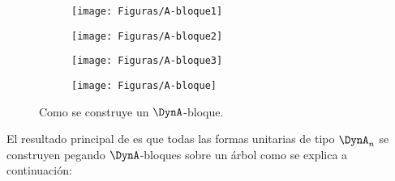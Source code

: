 \begin{figure}[H]
    \begin{subfigure}[b]{0.5\textwidth}
        \begin{minipage}{7cm}
        \centering%
         \texttt{[image: Figuras/A-bloque1]}
        \end{minipage}
    \end{subfigure}
    \begin{subfigure}[b]{0.5\textwidth}
        \begin{minipage}{7cm}
        \centering%
         \texttt{[image: Figuras/A-bloque2]}
        \end{minipage}
    \end{subfigure}
    \begin{subfigure}[b]{0.5\textwidth}
        \begin{minipage}{7cm}
        \centering%
         \texttt{[image: Figuras/A-bloque3]}
        \end{minipage}
    \end{subfigure}
    \begin{subfigure}[b]{0.5\textwidth}
        \begin{minipage}{7cm}
        \centering%
         \texttt{[image: Figuras/A-bloque]}
        \end{minipage}
    \end{subfigure}
    \caption{Como se construye un $\DynA$-bloque.}
    \label{figura:2.3}
\end{figure}

El resultado principal de \citep{Barot1999ACO} es que todas las formas unitarias de tipo $\DynA_{n}$ se construyen pegando $\DynA$-bloques sobre un árbol como se explica a continuación:

